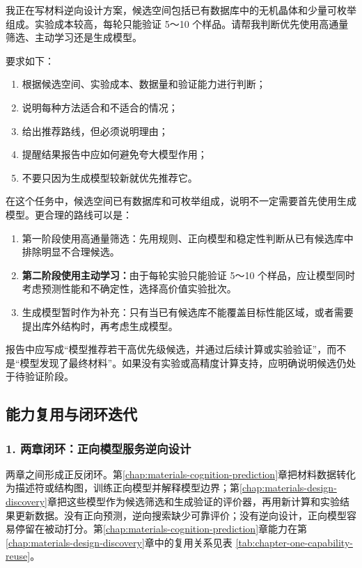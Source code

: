 \begin{samepage}
\begin{userbox}
我正在写材料逆向设计方案，候选空间包括已有数据库中的无机晶体和少量可枚举组成。实验成本较高，每轮只能验证 5～10 个样品。请帮我判断优先使用高通量筛选、主动学习还是生成模型。

要求如下：
\begin{enumerate}
\item 根据候选空间、实验成本、数据量和验证能力进行判断；
\item 说明每种方法适合和不适合的情况；
\item 给出推荐路线，但必须说明理由；
\item 提醒结果报告中应如何避免夸大模型作用；
\item 不要只因为生成模型较新就优先推荐它。
\end{enumerate}
\end{userbox}

\begin{aibox}
在这个任务中，候选空间已有数据库和可枚举组成，说明不一定需要首先使用生成模型。更合理的路线可以是：

\begin{enumerate}
\item 第一阶段使用高通量筛选：先用规则、正向模型和稳定性判断从已有候选库中排除明显不合理候选。
\item \textbf{第二阶段使用主动学习：}由于每轮实验只能验证 5～10 个样品，应让模型同时考虑预测性能和不确定性，选择高价值实验批次。
\item 生成模型暂时作为补充：只有当已有候选库不能覆盖目标性能区域，或者需要提出库外结构时，再考虑生成模型。
\end{enumerate}

报告中应写成“模型推荐若干高优先级候选，并通过后续计算或实验验证”，而不是“模型发现了最终材料”。如果没有实验或高精度计算支持，应明确说明候选仍处于待验证阶段。
\end{aibox}
\end{samepage}

\subsection{能力复用与闭环迭代}

\subsubsection*{\textbf{1. 两章闭环：正向模型服务逆向设计}}

两章之间形成正反闭环。第\ref{chap:materials-cognition-prediction}章把材料数据转化为描述符或结构图，训练正向模型并解释模型边界；第\ref{chap:materials-design-discovery}章把这些模型作为候选筛选和生成验证的评价器，再用新计算和实验结果更新数据。没有正向预测，逆向搜索缺少可靠评价；没有逆向设计，正向模型容易停留在被动打分。第\ref{chap:materials-cognition-prediction}章能力在第\ref{chap:materials-design-discovery}章中的复用关系见表 \ref{tab:chapter-one-capability-reuse}。


